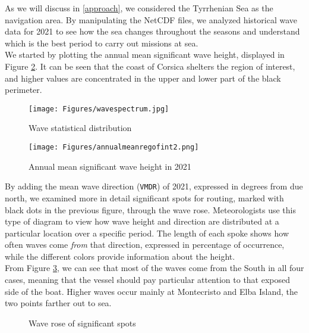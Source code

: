 As we will discuss in \autoref{approach}, we considered the Tyrrhenian Sea as the navigation area. By manipulating the NetCDF files, we analyzed historical wave data for 2021 to see how the sea changes throughout the seasons and understand which is the best period to carry out missions at sea.\\
We started by plotting the annual mean significant wave height, displayed in Figure \ref{annual}. It can be seen that the coast of Corsica shelters the region of interest, and higher values are concentrated in the upper and lower part of the black perimeter. %
\begin{figure}[H]
	\centering
	\texttt{[image: Figures/wavespectrum.jpg]}
	\caption{Wave statistical distribution}
	\label{wave}
\end{figure}
\begin{figure}[H]
	\centering
	\texttt{[image: Figures/annualmeanregofint2.png]}
	\caption{Annual mean significant wave height in 2021}
	\label{annual}
\end{figure}
By adding the mean wave direction (\texttt{VMDR}) of 2021, expressed in degrees from due north, we examined more in detail significant spots for routing, marked with black dots in the previous figure, through the wave rose. Meteorologists use this type of diagram to view how wave height and direction are distributed at a particular location over a specific period. The length of each spoke shows how often waves come \textit{from} that direction, expressed in percentage of occurrence, while the different colors provide information about the height.\\
From Figure \ref{waverose}, we can see that most of the waves come from the South in all four cases, meaning that the vessel should pay particular attention to that exposed side of the boat. Higher waves occur mainly at Montecristo and Elba Island, the two points farther out to sea.
\begin{figure}[h]
	\centering 
	\hspace{0.3cm}
	\hspace{0.3cm}
	\hspace{0.3cm}
	\caption{Wave rose of significant spots} 
	\label{waverose}
\end{figure}

